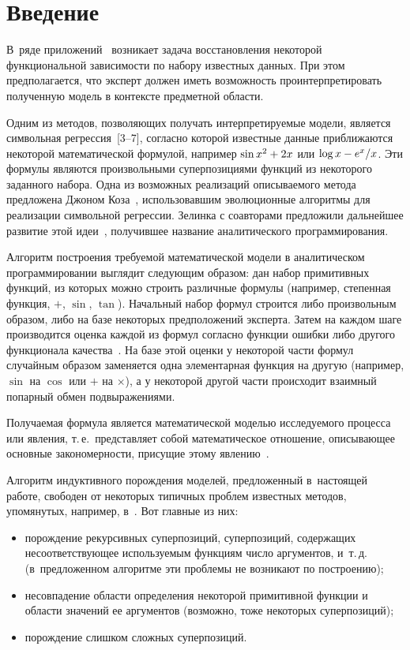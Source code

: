       \begin{multicols}{2}

            \label{st\stat}

\section{Введение}

В~ряде приложений~\cite{duffy:1999:srised, Barmpalexis201175}
возникает задача восстановления некоторой функциональной зависимости
по набору известных данных. При этом предполагается, что эксперт
должен иметь возможность проинтерпретировать полученную модель
в контексте предметной области.

Одним из методов, позволяющих получать интерпретируемые модели, является
символьная регрессия~[3--7],
согласно которой известные данные приближаются некоторой математической
формулой, например $\sin x^2 \hm+ 2x $ или $\log x \hm- {e^x}/{x} $.
Эти формулы являются произвольными суперпозициями функций из некоторого
заданного набора. Одна из возможных реализаций описываемого метода
предложена Джоном Коза~\cite{Koza1998GP, Koza1998Intro}, использовавшим
эволюционные алгоритмы для реализации символьной регрессии. Зелинка с соавторами
предложили дальнейшее развитие этой идеи~\cite{Zelinka2008}, получившее
название аналитического программирования.

Алгоритм построения требуемой математической модели в аналитическом
программировании выглядит следующим образом:
дан набор примитивных функций, из которых можно строить различные формулы
(например, степенная функция, $+$, $\sin$, $\tan$). Начальный набор формул
строится либо произвольным образом, либо на базе некоторых предположений
эксперта. Затем на каждом шаге производится оценка каждой из формул согласно
функции ошибки либо другого функционала качества~\cite{Tirsin2005}. На базе
этой оценки у некоторой части формул случайным образом заменяется одна
элементарная функция на другую (например, $\sin$ на $\cos$ или $+$ на
$\times$), а у некоторой другой части происходит взаимный попарный обмен
подвыражениями.

Получаемая формула является математической моделью исследуемого
процесса или явления, т.\,е.\ представляет собой математическое
отношение, описывающее основные закономерности, присущие этому
явлению~\cite{Pavlovsky2000}.

Алгоритм индуктивного порождения моделей, предложенный в~настоящей работе,
свободен от некоторых типичных проблем известных методов, упомянутых,
например, в~\cite{Zelinka2008}. Вот главные из них:
\begin{itemize}
  \item порождение рекурсивных суперпозиций, суперпозиций, содержащих
    несоответствующее используемым функциям число аргументов, и~т.\,д.
    (в~предложенном алгоритме эти проб\-ле\-мы не возникают по построению);
  \item несовпадение области определения некоторой примитивной функции и области
    значений ее аргументов (возможно, тоже некоторых суперпозиций);
  \item порождение слишком сложных суперпозиций.
\end{itemize}


\end{multicols}
